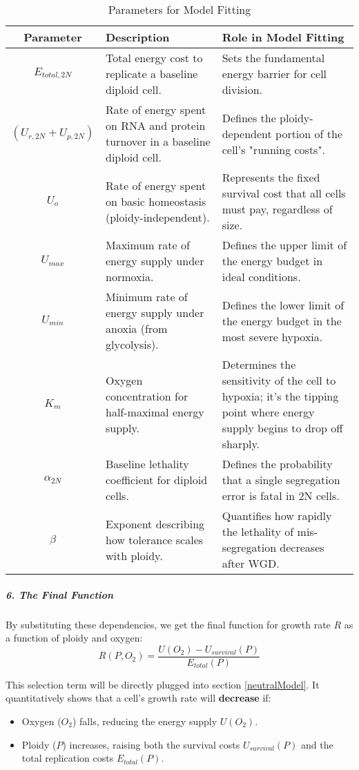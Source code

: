 \documentclass{article}
\begin{document}
\begin{table}[hbt!]
\centering
\caption{\color{blue} Parameters for Model Fitting}
\label{tab:parameters}
\begin{tabular}{|c|p{5cm}|p{6cm}|}
\hline
\textbf{Parameter} & \textbf{Description} & \textbf{Role in Model Fitting} \\
\hline
$E_{total, 2N}$ & Total energy cost to replicate a baseline diploid cell. & Sets the fundamental energy barrier for cell division. \\
\hline
$(U_{r, 2N} + U_{p, 2N})$ & Rate of energy spent on RNA and protein turnover in a baseline diploid cell. & Defines the ploidy-dependent portion of the cell's "running costs". \\
\hline
$U_o$ & Rate of energy spent on basic homeostasis (ploidy-independent). & Represents the fixed survival cost that all cells must pay, regardless of size. \\
\hline
$U_{max}$ & Maximum rate of energy supply under normoxia. & Defines the upper limit of the energy budget in ideal conditions. \\
\hline
$U_{min}$ & Minimum rate of energy supply under anoxia (from glycolysis). & Defines the lower limit of the energy budget in the most severe hypoxia. \\
\hline
$K_m$ & Oxygen concentration for half-maximal energy supply. & Determines the sensitivity of the cell to hypoxia; it's the tipping point where energy supply begins to drop off sharply. \\
\hline
$\alpha_{2N}$ & Baseline lethality coefficient for diploid cells. & Defines the probability that a single segregation error is fatal in 2N cells. \\
\hline
$\beta$ & Exponent describing how tolerance scales with ploidy. & Quantifies how rapidly the lethality of mis-segregation decreases after WGD. \\
\hline
\end{tabular}
\end{table}

\subparagraph{6. The Final Function}
By substituting these dependencies, we get the final function for growth rate $R$ as a function of ploidy and oxygen:
\color{blue}
$$
R(P, O_2) = \frac{U(O_2) - U_{survival}(P)}{E_{total}(P)}
$$

This selection term will be directly plugged into section \ref{neutralModel}. \color{black} It quantitatively shows that a cell's growth rate will \textbf{decrease} if:
\begin{itemize}
    \item Oxygen ($O_2$) falls, reducing the energy supply $U(O_2)$.
    \item Ploidy ($P$) increases, raising both the survival costs $U_{survival}(P)$ and the total replication costs $E_{total}(P)$.
\end{itemize}
\end{document}
